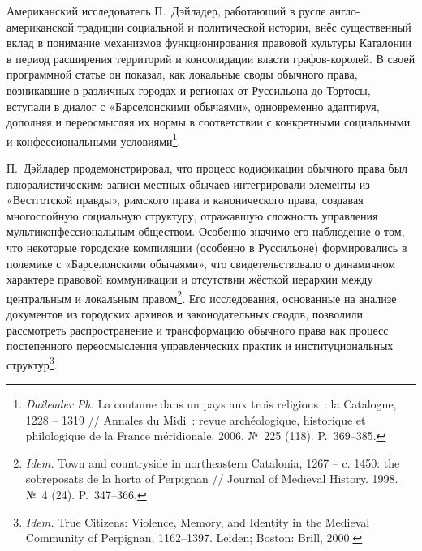 Американский исследователь П.~Дэйладер, работающий в русле англо-американской традиции социальной и политической истории, внёс существенный вклад в понимание механизмов функционирования правовой культуры Каталонии в период расширения территорий и консолидации власти графов-королей. В своей программной статье он показал, как локальные своды обычного права, возникавшие в различных городах и регионах от Руссильона до Тортосы, вступали в диалог с «Барселонскими обычаями», одновременно адаптируя, дополняя и переосмысляя их нормы в соответствии с конкретными социальными и конфессиональными условиями\footnote{\emph{Daileader Ph.} La coutume dans un pays aux trois religions~: la Catalogne, 1228 -- 1319 // Annales du Midi~: revue archéologique, historique et philologique de la France méridionale. 2006. №~225 (118). P.~369--385.}.

П.~Дэйладер продемонстрировал, что процесс кодификации обычного права был плюралистическим: записи местных обычаев интегрировали элементы из «Вестготской правды», римского права и канонического права, создавая многослойную социальную структуру, отражавшую сложность управления мультиконфессиональным обществом. Особенно значимо его наблюдение о том, что некоторые городские компиляции (особенно в Руссильоне) формировались в полемике с «Барселонскими обычаями», что свидетельствовало о динамичном характере правовой коммуникации и отсутствии жёсткой иерархии между центральным и локальным правом\footnote{\emph{Idem.} Town and countryside in northeastern Catalonia, 1267 -- c. 1450: the sobreposats de la horta of Perpignan // Journal of Medieval History. 1998. №~4 (24). P.~347--366.}. Его исследования, основанные на анализе документов из городских архивов и законодательных сводов, позволили рассмотреть распространение и трансформацию обычного права как процесс постепенного переосмысления управленческих практик и институциональных структур\footnote{\emph{Idem.} True Citizens: Violence, Memory, and Identity in the Medieval Community of Perpignan, 1162--1397. Leiden; Boston: Brill, 2000.}.

